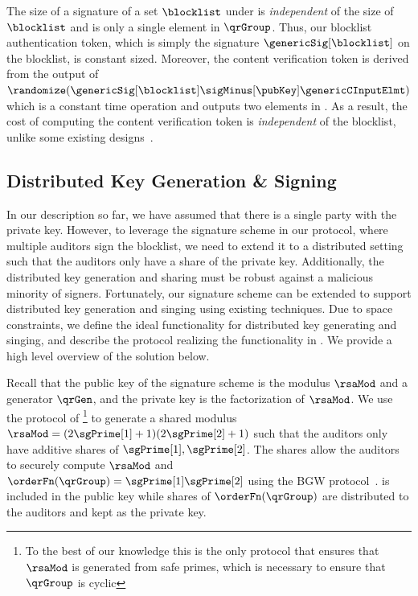 \begin{remark}
The size of a signature of a set $\blocklist$ under \ourSigScheme is \emph{independent} of the size of $\blocklist$ and is only a single element in $\qrGroup$. Thus, our blocklist authentication token, which is simply the signature $\genericSig[\blocklist]$ on the blocklist, is constant sized. Moreover, the content verification token is derived from the output of $\randomize(\genericSig[\blocklist] \sigMinus[\pubKey] \genericCInputElmt)$ which is a constant time operation and outputs two elements in \qrGroup. As a result, the cost of computing the content verification token is \emph{independent} of the blocklist, unlike some existing designs~\cite{kulshrestha2021identifying}. 
\end{remark}

\subsection{Distributed Key Generation \& Signing}
%
In our description so far, we have assumed that there is a single party with the private key. However, to leverage the signature scheme in our protocol, where multiple auditors sign the blocklist, we need to extend it to a distributed setting such that the auditors only have a share of the private key. Additionally, the distributed key generation and sharing must be robust against a malicious minority of signers. Fortunately, our signature scheme can be extended to support distributed key generation and singing using existing techniques. Due to space constraints, we define the ideal functionality \distSigningFunc for distributed key generating and singing, and describe the protocol realizing the functionality in . We provide a high level overview of the solution below. 

%
Recall that the public key of the signature scheme is the modulus $\rsaMod$ and a generator $\qrGen$, and the private key is the factorization of $\rsaMod$. We use the protocol of \citet{algesheimer2002efficient}\footnote{To the best of our knowledge this is the only protocol that ensures that $\rsaMod$ is generated from safe primes, which is necessary to ensure that $\qrGroup$ is cyclic} to generate a shared modulus $\rsaMod = (2 \sgPrime[1] + 1) (2 \sgPrime[2] + 1)$ such that the auditors only have additive shares of $\sgPrime[1], \sgPrime[2]$.  
 The shares allow the auditors to securely compute $\rsaMod$ and $\orderFn(\qrGroup) = \sgPrime[1] \sgPrime[2]$ using the BGW protocol~\cite{asharov2017full}. \rsaMod is included in the public key while shares of $\orderFn(\qrGroup)$ are distributed to the auditors and kept as the private key. 

